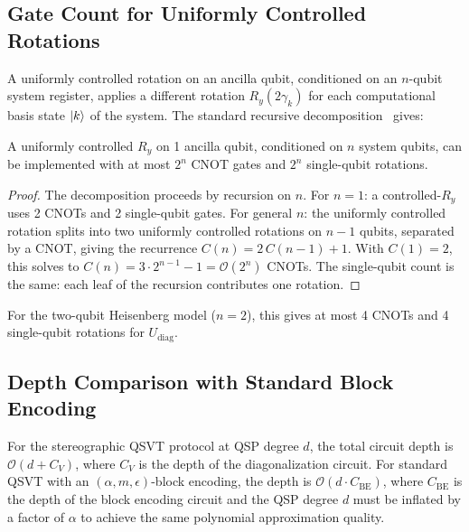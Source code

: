 \subsection{Gate Count for Uniformly Controlled Rotations}
\label{app:ucr-gates}

A uniformly controlled rotation on an ancilla qubit,
conditioned on an $n$-qubit system register, applies a
different rotation $R_y(2\gamma_k)$ for each computational
basis state $\ket{k}$ of the system.  The standard
recursive decomposition~\cite{NielsenChuang2010} gives:

\begin{proposition}
	\label{prop:ucr-count}
	A uniformly controlled $R_y$ on 1 ancilla qubit,
	conditioned on $n$ system qubits, can be implemented with
	at most $2^n$ CNOT gates and $2^n$ single-qubit
	rotations.
\end{proposition}

\begin{proof}
	The decomposition proceeds by recursion on $n$.  For
	$n = 1$: a controlled-$R_y$ uses 2 CNOTs and 2
	single-qubit gates.  For general $n$: the uniformly
	controlled rotation splits into two uniformly controlled
	rotations on $n-1$ qubits, separated by a CNOT, giving
	the recurrence $C(n) = 2\,C(n-1) + 1$.  With $C(1) = 2$,
	this solves to $C(n) = 3\cdot 2^{n-1} - 1 = \mathcal{O}(2^n)$ CNOTs.  The single-qubit
	count is the same: each leaf of the recursion contributes
	one rotation.
\end{proof}

For the two-qubit Heisenberg model ($n = 2$), this gives
at most 4 CNOTs and 4 single-qubit rotations for
$U_{\mathrm{diag}}$.

\subsection{Depth Comparison with Standard Block Encoding}
\label{app:depth-comparison}

\begin{corollary}
	\label{cor:depth-proof}
	For the stereographic QSVT protocol at QSP degree $d$,
	the total circuit depth is $\mathcal{O}(d + C_V)$, where
	$C_V$ is the depth of the diagonalization circuit.
	For standard QSVT with an $(\alpha, m, \epsilon)$-block
	encoding, the depth is $\mathcal{O}(d \cdot C_{\mathrm{BE}})$,
	where $C_{\mathrm{BE}}$ is the depth of the block
	encoding circuit and the QSP degree $d$ must be inflated
	by a factor of $\alpha$ to achieve the same polynomial
	approximation quality.
\end{corollary}

